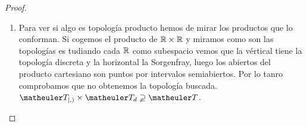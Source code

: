 \begin{proof}
\begin{enumerate}
		\item Para ver si algo es topología producto hemos de mirar los productos que lo conforman. Si cogemos el producto de $\mathbb{R} \times \mathbb{R}$ y miramos como son las topologías  es tudiando cada $\mathbb{R}$ como subespacio vemos que la vértical tiene la topología discreta y la horizontal la Sorgenfray, luego los abiertos del producto cartesiano son puntos por intervalos semiabiertos. Por lo tanro comprobamos que no obtenemos la topología buscada. $\T_{[,)} \times \T_{d} \varsupsetneq \T$.
	\end{enumerate}	
\end{proof}